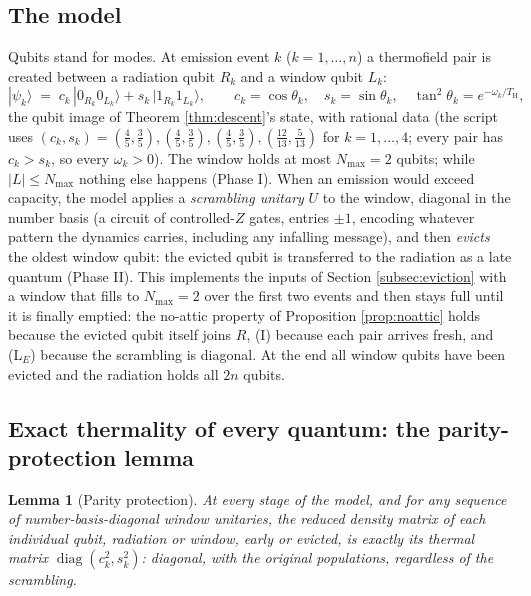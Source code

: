 \documentclass[11pt]{article}
\newtheorem{lemma}[theorem]{Lemma}
\theoremstyle{definition}
\renewcommand{\TH}{T_{\mathrm{H}}} %
\begin{document}
\subsection{The model}\label{subsec:modeldef}

Qubits stand for modes. At emission event $k$ ($k = 1, \dots, n$) a thermofield pair is created between a radiation qubit $R_k$ and a window qubit $L_k$:
\[
|\psi_k\rangle \;=\; c_k\,|0_{R_k} 0_{L_k}\rangle + s_k\,|1_{R_k} 1_{L_k}\rangle, \qquad c_k = \cos\theta_k, \quad s_k = \sin\theta_k, \quad \tan^2\theta_k = e^{-\omega_k/\TH} ,
\]
the qubit image of Theorem \ref{thm:descent}'s state, with rational data (the script uses $(c_k, s_k) = (\tfrac45, \tfrac35), (\tfrac45, \tfrac35), (\tfrac45, \tfrac35), (\tfrac{12}{13}, \tfrac{5}{13})$ for $k = 1, \dots, 4$; every pair has $c_k > s_k$, so every $\omega_k > 0$). The window holds at most $N_{\max} = 2$ qubits; while $|L| \leq N_{\max}$ nothing else happens (Phase I). When an emission would exceed capacity, the model applies a \emph{scrambling unitary} $U$ to the window, diagonal in the number basis (a circuit of controlled-$Z$ gates, entries $\pm 1$, encoding whatever pattern the dynamics carries, including any infalling message), and then \emph{evicts} the oldest window qubit: the evicted qubit is transferred to the radiation as a late quantum (Phase II). This implements the inputs of Section \ref{subsec:eviction} with a window that fills to $N_{\max} = 2$ over the first two events and then stays full until it is finally emptied: the no-attic property of Proposition \ref{prop:noattic} holds because the evicted qubit itself joins $R$, (I) because each pair arrives fresh, and (L$_E$) because the scrambling is diagonal. At the end all window qubits have been evicted and the radiation holds all $2n$ qubits.

\subsection{Exact thermality of every quantum: the parity-protection lemma}\label{subsec:parity}

\begin{lemma}[Parity protection]\label{lem:parity}
At every stage of the model, and for \emph{any} sequence of number-basis-diagonal window unitaries, the reduced density matrix of each individual qubit, radiation or window, early or evicted, is exactly its thermal matrix $\operatorname{diag}(c_k^2, s_k^2)$: diagonal, with the original populations, regardless of the scrambling.
\end{lemma}
\end{document}
